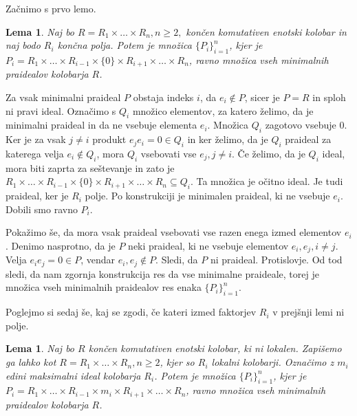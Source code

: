 \documentclass[a4paper, 12pt]{amsart}
\theoremstyle{definition} %
\theoremstyle{plain} %
\newtheorem{lema}[definicija]{Lema}
\begin{document}
Začnimo s prvo lemo. 
\begin{lema}
\label{minPra1}
Naj bo $R=R_1 \times \dots \times R_n, n\ge 2,$ končen komutativen enotski kolobar in naj bodo $R_i$ končna polja. Potem je množica $\{P_i\}_{i=1}^n$, kjer je $P_i = R_1 \times \dots \times R_{i-1} \times \{0\} \times R_{i+1} \times \dots \times R_n$, ravno množica vseh minimalnih praidealov kolobarja $R$.
\end{lema}

\proof
Za vsak minimalni praideal $P$ obstaja indeks $i$, da $e_i\notin P$, sicer je $P = R$ in sploh ni pravi ideal. Označimo s $Q_i$ množico elementov, za katero želimo, da je minimalni praideal in da ne vsebuje elementa $e_i$. Množica $Q_i$ zagotovo vsebuje $0$. Ker je za vsak $j\neq i$ produkt $e_j e_i = 0\in Q_i$ in ker želimo, da je $Q_i$ praideal za katerega velja $e_i \notin Q_i$, mora $Q_i$ vsebovati vse $e_j, j\neq i$. Če želimo, da je $Q_i$ ideal, mora biti zaprta za seštevanje in zato je $ R_1 \times \dots \times R_{i-1} \times \{0\} \times R_{i+1} \times \dots \times R_n \subseteq Q_i$. Ta množica je očitno ideal. Je tudi praideal, ker je $R_i$ polje. Po konstrukciji je minimalen praideal, ki ne vsebuje $e_i$. Dobili smo ravno $P_i$.

Pokažimo še, da mora vsak praideal vsebovati vse razen enega izmed elementov $e_i$. Denimo nasprotno, da je $P$ neki praideal, ki ne vsebuje elementov $e_i,e_j, i\neq j$. Velja $e_i e_j = 0\in P$, vendar $e_i,e_j \notin P$. Sledi, da $P$ ni praideal. Protislovje. 
Od tod sledi, da nam zgornja konstrukcija res da vse minimalne praideale, torej je množica vseh minimalnih praidealov res enaka $\{P_i\}_{i=1}^n$.
\endproof

Poglejmo si sedaj še, kaj se zgodi, če kateri izmed faktorjev $R_i$ v prejšnji lemi ni polje.

\begin{lema}
\label{minPra2}
Naj bo $R$ končen komutativen enotski kolobar, ki ni lokalen. Zapišemo ga lahko kot $R = R_1 \times \dots \times R_n, n\ge2$, kjer so $R_i$ lokalni kolobarji. Označimo z $m_i$ edini maksimalni ideal kolobarja $R_i$. Potem je množica $\{P_i\}_{i=1}^n$, kjer je $P_i = R_1 \times \dots \times R_{i-1} \times m_i \times R_{i+1} \times \dots \times R_n$, ravno množica vseh minimalnih praidealov kolobarja $R$.
\end{lema}
\end{document}
